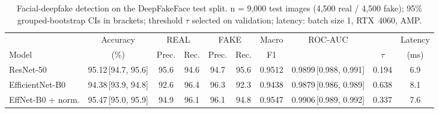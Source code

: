 \begin{table}[!t]
\centering
\caption{Facial-deepfake detection on the DeepFakeFace test split. n = 9,000 test images (4,500 real / 4,500 fake); 95\% grouped-bootstrap CIs in brackets; threshold $\tau$ selected on validation; latency: batch size 1, RTX~4060, AMP.}
\label{tab:main_dff}
\setlength{\tabcolsep}{4pt}
\begin{tabular}{lccccccccc}
\toprule
 & Accuracy & \multicolumn{2}{c}{REAL} & \multicolumn{2}{c}{FAKE} & Macro & ROC-AUC & & Latency \\
\cmidrule(lr){3-4}\cmidrule(lr){5-6}
Model & (\%) & Prec. & Rec. & Prec. & Rec. & F1 & & $\tau$ & (ms) \\
\midrule
ResNet-50 & 95.12\,{\scriptsize[94.7, 95.6]} & 95.6 & 94.6 & 94.7 & 95.6 & 0.9512 & 0.9899\,{\scriptsize[0.988, 0.991]} & 0.194 & 6.9 \\
EfficientNet-B0 & 94.38\,{\scriptsize[93.9, 94.8]} & 92.6 & 96.4 & 96.3 & 92.3 & 0.9438 & 0.9879\,{\scriptsize[0.986, 0.989]} & 0.638 & 8.1 \\
EffNet-B0 + norm. & 95.47\,{\scriptsize[95.0, 95.9]} & 94.9 & 96.1 & 96.1 & 94.8 & 0.9547 & 0.9906\,{\scriptsize[0.989, 0.992]} & 0.337 & 7.6 \\
\bottomrule
\end{tabular}
\end{table}
